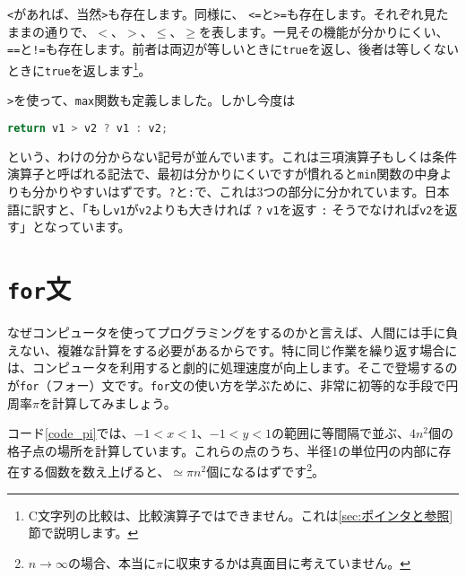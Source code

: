 \texttt{<}があれば、当然\texttt{>}も存在します。同様に、 \texttt{<=}と\texttt{>=}も存在します。それぞれ見たままの通りで、$<$、$>$、$\le$、$\ge$を表します。一見その機能が分かりにくい、\texttt{==}と\texttt{!=}も存在します。前者は両辺が等しいときに\texttt{true}を返し、後者は等しくないときに\texttt{true}を返します\footnote{C文字列の比較は、比較演算子ではできません。これは\ref{sec:ポインタと参照}節で説明します。}。

\texttt{>}を使って、\texttt{max}関数も定義しました。しかし今度は
\begin{lstlisting}[language=c++]
  return v1 > v2 ? v1 : v2;
\end{lstlisting}
という、わけの分からない記号が並んでいます。これは三項演算子もしくは条件演算子と呼ばれる記法で、最初は分かりにくいですが慣れると\texttt{min}関数の中身よりも分かりやすいはずです。\texttt{?}と\texttt{:}で、これは3つの部分に分かれています。日本語に訳すと、「もし\texttt{v1}が\texttt{v2}よりも大きければ \texttt{?} \texttt{v1}を返す \texttt{:} そうでなければ\texttt{v2}を返す」となっています。

\section{\texttt{for}文}

なぜコンピュータを使ってプログラミングをするのかと言えば、人間には手に負えない、複雑な計算をする必要があるからです。特に同じ作業を繰り返す場合には、コンピュータを利用すると劇的に処理速度が向上します。そこで登場するのが\texttt{for}（フォー）文です。\texttt{for}文の使い方を学ぶために、非常に初等的な手段で円周率$\pi$を計算してみましょう。



コード\ref{code_pi}では、$-1<x<1$、$-1<y<1$の範囲に等間隔で並ぶ、$4n^2$個の格子点の場所を計算しています。これらの点のうち、半径1の単位円の内部に存在する個数を数え上げると、$\simeq\pi n^2$個になるはずです\footnote{$n\rightarrow\infty$の場合、本当に$\pi$に収束するかは真面目に考えていません。}。

